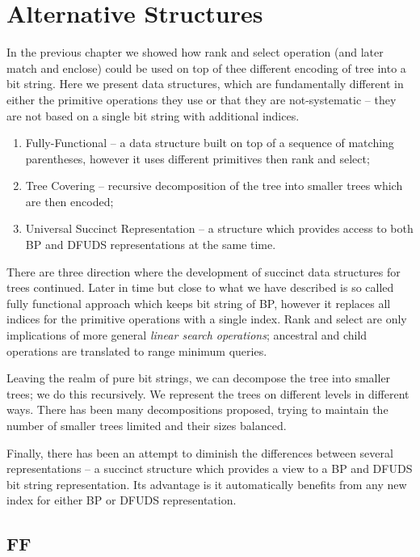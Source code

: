 \chapter{Alternative Structures}

In the previous chapter we showed how rank and select operation (and later match and enclose) could be used on top of thee different encoding of tree into a bit string.
Here we present data structures, which are fundamentally different in either the primitive operations they use or that they are not-systematic -- they are not based on a single bit string with additional indices.

\begin{enumerate}
	\item Fully-Functional -- a data structure built on top of a sequence of matching parentheses, however it uses different primitives then rank and select;
	\item Tree Covering -- recursive decomposition of the tree into smaller trees which are then encoded;
	\item Universal Succinct Representation -- a structure which provides access to both BP and DFUDS representations at the same time.
\end{enumerate}

There are three direction where the development of succinct data structures for trees continued.
Later in time but close to what we have described is so called fully functional approach which keeps bit string of BP, however it replaces all indices for the primitive operations with a single index.
Rank and select are only implications of more general \emph{linear search operations}; ancestral and child operations are translated to range minimum queries.

Leaving the realm of pure bit strings, we can decompose the tree into smaller trees; we do this recursively.
We represent the trees on different levels in different ways.
There has been many decompositions proposed, trying to maintain the number of smaller trees limited and their sizes balanced.

Finally, there has been an attempt to diminish the differences between several representations -- a succinct structure which provides a view to a BP and DFUDS bit string representation.
Its advantage is it automatically benefits from any new index for either BP or DFUDS representation.

\section{FF}

